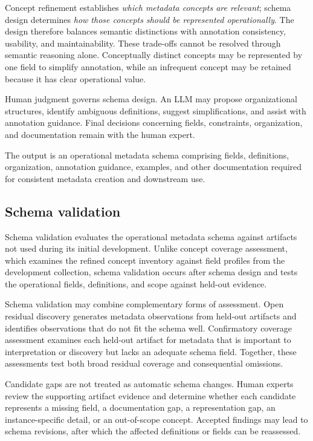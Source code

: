 \documentclass{article}
\begin{document}
Concept refinement establishes \emph{which metadata concepts are relevant}; schema design determines \emph{how those concepts should be represented operationally}. The design therefore balances semantic distinctions with annotation consistency, usability, and maintainability. These trade-offs cannot be resolved through semantic reasoning alone. Conceptually distinct concepts may be represented by one field to simplify annotation, while an infrequent concept may be retained because it has clear operational value.

Human judgment governs schema design. An LLM may propose organizational structures, identify ambiguous definitions, suggest simplifications, and assist with annotation guidance. Final decisions concerning fields, constraints, organization, and documentation remain with the human expert.

The output is an operational metadata schema comprising fields, definitions, organization, annotation guidance, examples, and other documentation required for consistent metadata creation and downstream use.

\subsection{Schema validation}
\label{sec:schema_validation_methodology}

Schema validation evaluates the operational metadata schema against artifacts not used during its initial development. Unlike concept coverage assessment, which examines the refined concept inventory against field profiles from the development collection, schema validation occurs after schema design and tests the operational fields, definitions, and scope against held-out evidence.

Schema validation may combine complementary forms of assessment. Open residual discovery generates metadata observations from held-out artifacts and identifies observations that do not fit the schema well. Confirmatory coverage assessment examines each held-out artifact for metadata that is important to interpretation or discovery but lacks an adequate schema field. Together, these assessments test both broad residual coverage and consequential omissions.

Candidate gaps are not treated as automatic schema changes. Human experts review the supporting artifact evidence and determine whether each candidate represents a missing field, a documentation gap, a representation gap, an instance-specific detail, or an out-of-scope concept. Accepted findings may lead to schema revisions, after which the affected definitions or fields can be reassessed.
\end{document}
